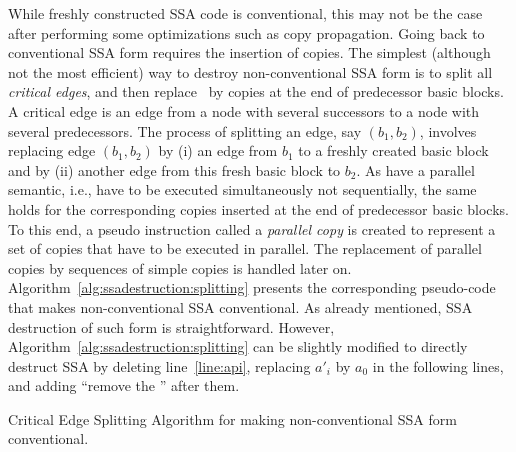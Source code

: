 {While freshly constructed SSA code is conventional, 
this may not be the case after performing some optimizations 
such as copy propagation.
Going back to conventional SSA form requires the insertion of copies.
%
The simplest (although not the most efficient) way to destroy non-conventional SSA form is to split all \textit{critical edges}, and then replace \phifuns\ by copies at the end of predecessor basic blocks. 
A critical edge is an edge from a node with several successors to a node with several predecessors.
The process of splitting an edge, say $(b_1,b_2)$,
involves replacing edge $(b_1, b_2)$ by (i) an
edge from $b_1$ to a freshly created basic block 
and by (ii) another edge from this fresh basic block to $b_2$. 
As \phifuns have a parallel semantic, i.e., have to be executed simultaneously not sequentially, the same holds for the corresponding copies inserted at the end of predecessor basic blocks. To this end, a pseudo instruction called a \emph{parallel copy} is created to represent a set of copies that have to be executed in parallel.
The replacement of parallel copies by sequences of simple copies is handled later on.
Algorithm~\ref{alg:ssadestruction:splitting} presents
the corresponding pseudo-code that makes non-conventional SSA conventional. 
As already mentioned, SSA destruction of such form is straightforward. However, 
Algorithm~\ref{alg:ssadestruction:splitting} can be slightly modified to 
directly destruct SSA by deleting line~\ref{line:api}, replacing $a'_i$ by $a_0$ in the 
following lines, and adding ``remove the \phifun'' after them.

\begin{algorithm}
\LinesNumbered
{}
\caption{\label{alg:ssadestruction:splitting}Critical Edge Splitting Algorithm for making non-conventional SSA form conventional.}
\end{algorithm}



}
